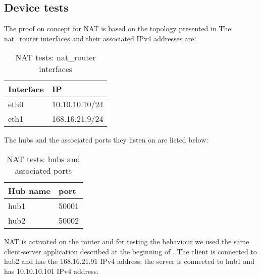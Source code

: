 {{\subsection{Device tests}
\label{sub-sec:nat-tests}
The proof on concept for NAT is based on the topology presented in 
The nat_router interfaces and their associated IPv4 addresses are:
\begin{center}
  \begin{table}[htb]
  \begin{center}
  \begin{tabular}{| l | l | }
    \hline
      Interface & IP \\ \hline
      eth0 & 10.10.10.10/24 \\ \hline
      eth1 & 168.16.21.9/24\\
    \hline
  \end{tabular}
  \end{center}
  \caption{NAT tests: nat_router interfaces}
  \label{table:nat-top}
  \end{table}
\end{center}
The hubs and the associated ports they listen on are listed below:
\begin{center}
  \begin{table}[htb]
  \begin{center}
  \begin{tabular}{| l | l | }
    \hline
      Hub name & port \\ \hline
      hub1 & 50001 \\ \hline
      hub2 & 50002\\ 
    \hline
  \end{tabular}
  \end{center}
  \caption{NAT tests: hubs and associated ports}
  \label{table:nat-hubs}
  \end{table}
\end{center}

NAT is activated on the router and for testing the behaviour we used the same client-server application described 
at the beginning of . The client is connected to hub2 and has the 168.16.21.91 IPv4 
address; the server is connected to hub1 and has 10.10.10.101 IPv4 address.

}}
